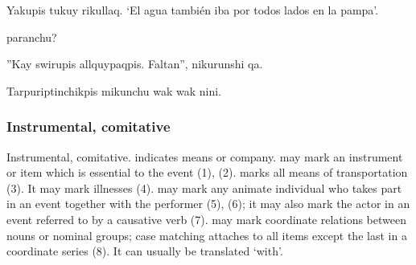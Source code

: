 {%
{Yakupis tukuy  rikullaq.}%
{
}%
%
{`El agua tambi\'en iba por todos lados en la pampa'.}%
{}{}%

%
{\textquestiondown{} paranchu?}%
{}%
{}{}%

%
{''Kay swirupis allquypaqpis. Faltan'', nikurunshi qa.}%
{}%
{}{}%

%
{Tarpuriptinchikpis mikunchu wak  wak  nini.}%
{}%
{}{}%

\subsubsection{Instrumental, comitative }
Instrumental, comitative.  indicates means or company.  may mark an instrument or item which is essential to the event (1), (2).  marks all means of transportation (3). It may mark illnesses (4).  may mark any animate individual who takes part in an event together with the performer (5), (6); it may also mark the actor in an event referred to by a causative verb (7).  may mark coordinate relations between nouns or nominal groups; case matching attaches to all items except the last in a coordinate series (8). It can usually be translated `with'.

}
